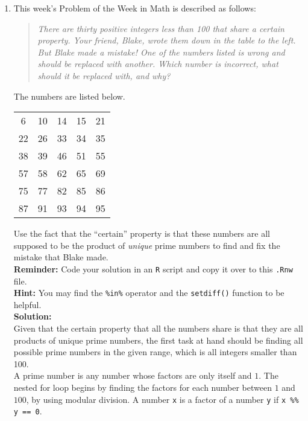 \documentclass{article}\usepackage[]{graphicx}\usepackage[]{xcolor}
\begin{document}
\begin{enumerate}
\item This week's Problem of the Week in Math is described as follows:
\begin{quotation}
  \textit{There are thirty positive integers less than 100 that share a certain 
  property. Your friend, Blake, wrote them down in the table to the left. But 
  Blake made a mistake! One of the numbers listed is wrong and should be replaced 
  with another. Which number is incorrect, what should it be replaced with, and 
  why?}
\end{quotation}
The numbers are listed below.
\begin{center}
  \begin{tabular}{ccccc}
    6 & 10 & 14 & 15 & 21\\
    22 & 26 & 33 & 34 & 35\\
    38 & 39 & 46 & 51 & 55\\
    57 & 58 & 62 & 65 & 69\\
    75 & 77 & 82 & 85 & 86\\
    87 & 91 & 93 & 94 & 95
  \end{tabular}
\end{center}
Use the fact that the ``certain'' property is that these numbers are all supposed
to be the product of \emph{unique} prime numbers to find and fix the mistake that
Blake made.\\
\textbf{Reminder:} Code your solution in an \texttt{R} script and copy it over
to this \texttt{.Rnw} file.\\
\textbf{Hint:} You may find the \verb|%in%| operator and the \verb|setdiff()| function to be helpful.\\

\textbf{Solution:} \\
Given that the certain property that all the numbers share is that they are all products of unique prime numbers, the first task at hand should be finding all possible prime numbers in the given range, which is all integers smaller than 100. \\

A prime number is any number whose factors are only itself and $1$. The nested for loop begins by finding the factors for each number between $1$ and $100$, by using modular division. A number \texttt{x} is a factor of a number \texttt{y} if \verb|x %% y == 0|. \\


\end{enumerate}
\end{document}
